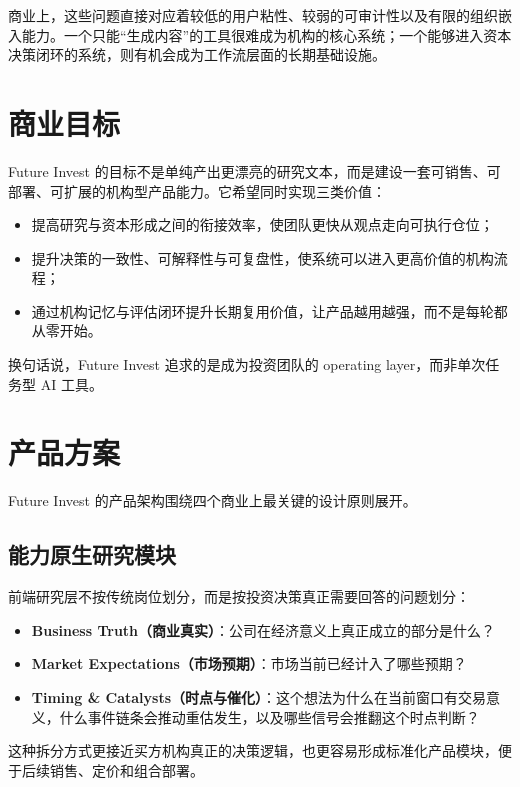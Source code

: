 \documentclass[11pt]{article}
\begin{document}
商业上，这些问题直接对应着较低的用户粘性、较弱的可审计性以及有限的组织嵌入能力。一个只能“生成内容”的工具很难成为机构的核心系统；一个能够进入资本决策闭环的系统，则有机会成为工作流层面的长期基础设施。

\section{商业目标}

Future Invest 的目标不是单纯产出更漂亮的研究文本，而是建设一套可销售、可部署、可扩展的机构型产品能力。它希望同时实现三类价值：

\begin{itemize}
\item 提高研究与资本形成之间的衔接效率，使团队更快从观点走向可执行仓位；
\item 提升决策的一致性、可解释性与可复盘性，使系统可以进入更高价值的机构流程；
\item 通过机构记忆与评估闭环提升长期复用价值，让产品越用越强，而不是每轮都从零开始。
\end{itemize}

换句话说，Future Invest 追求的是成为投资团队的 operating layer，而非单次任务型 AI 工具。

\section{产品方案}

Future Invest 的产品架构围绕四个商业上最关键的设计原则展开。

\subsection{能力原生研究模块}

前端研究层不按传统岗位划分，而是按投资决策真正需要回答的问题划分：

\begin{itemize}
\item \textbf{Business Truth（商业真实）}：公司在经济意义上真正成立的部分是什么？
\item \textbf{Market Expectations（市场预期）}：市场当前已经计入了哪些预期？
\item \textbf{Timing \& Catalysts（时点与催化）}：这个想法为什么在当前窗口有交易意义，什么事件链条会推动重估发生，以及哪些信号会推翻这个时点判断？
\end{itemize}

这种拆分方式更接近买方机构真正的决策逻辑，也更容易形成标准化产品模块，便于后续销售、定价和组合部署。
\end{document}
